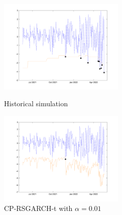 \documentclass[preprint,12pt,authoryear]{elsarticle}
\begin{document}
\begin{figure}[htbp]
\centering
\begin{minipage}[t]{0.48\textwidth}
\centering
\includegraphics[width=6cm]{Peimin/VaR_HS_99.png}
\caption{Historical simulation}
\end{minipage}
\begin{minipage}[t]{0.48\textwidth}
\centering
\includegraphics[width=6cm]{Peimin/VaR_CPRSGARCH_T_99.png}
\caption{CP-RSGARCH-t with $\alpha=0.01$}
\end{minipage}
\end{figure}

\label{EndOfDocument}
\end{document}
